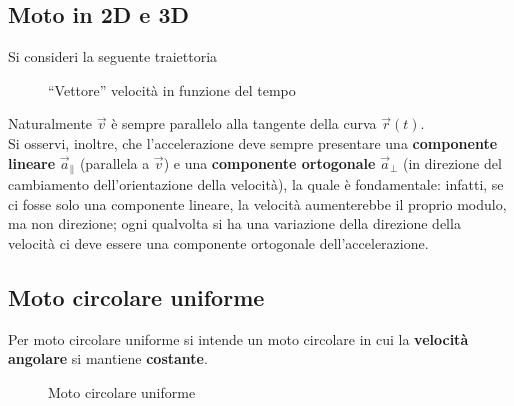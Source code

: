 \documentclass[a4paper]{extarticle}
\newcommand{\quotes}[1]{``#1''}
\begin{document}
\vspace{1em}
\subsection{Moto in 2D e 3D}
Si consideri la seguente traiettoria

\begin{figure}[H]
  \centering
  \caption{\quotes{Vettore} velocità in funzione del tempo}
  \label{fig:vettore_velocità_funzione_tempo}
\end{figure}

\vspace{1em}
\noindent
Naturalmente $\vec{v}$ è sempre parallelo alla tangente della curva $\vec{r}(t)$.\\
Si osservi, inoltre, che l'accelerazione deve sempre presentare una \textbf{componente lineare} $\vec{a}_\parallel$ (parallela a $\vec{v}$) e una \textbf{componente ortogonale} $\vec{a}_\perp$ (in direzione del cambiamento dell'orientazione della velocità), la quale è fondamentale: infatti, se ci fosse solo una componente lineare, la velocità aumenterebbe il proprio modulo, ma non direzione; ogni qualvolta si ha una variazione della direzione della velocità ci deve essere una componente ortogonale dell'accelerazione.

\vspace{1em}
\noindent
\subsection{Moto circolare uniforme}
Per moto circolare uniforme si intende un moto circolare in cui la \textbf{velocità angolare} si mantiene \textbf{costante}.\\

\begin{figure}[H]
  \centering
  \caption{Moto circolare uniforme}
  \label{fig:moto_circolare_uniforme}
\end{figure}
\end{document}
